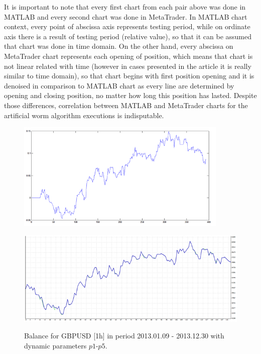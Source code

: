 \documentclass[runningheads,a4paper]{llncs}
\begin{document}
\FloatBarrier
\vspace{-1em}
It is important to note that every first chart from each pair above was done in MATLAB and every second chart was done in MetaTrader. In MATLAB chart context, every point of abscissa axis represents testing period, while on ordinate axis there is a result of testing period (relative value), so that it can be assumed that chart was done in time domain. On the other hand, every abscissa on MetaTrader chart represents each opening of position, which means that chart is not linear related with time (however in cases presented in the article it is really similar to time domain), so that chart begins with first position opening and it is denoised in comparison to MATLAB chart as every line are determined by opening and closing position, no matter how long this position has lasted. Despite those differences, correlation between MATLAB and MetaTrader charts for the artificial worm algorithm executions is indisputable.
\begin{figure}[h!]
\begin{minipage}{0.49\textwidth}
\centering
\includegraphics[width = 0.9\textwidth]{figures/rys14.png}
\label{fig:fig14}
\end{minipage}
\begin{minipage}{0.49\textwidth}
\centering
\includegraphics[width = \textwidth]{figures/rys15.png}
\label{fig:fig15}
\end{minipage}
\caption{Balance for GBPUSD [1h] in period 2013.01.09 - 2013.12.30 with dynamic parameters $p1$-$p5$.}
\end{figure}
\FloatBarrier
\vspace{-1em}
\end{document}
